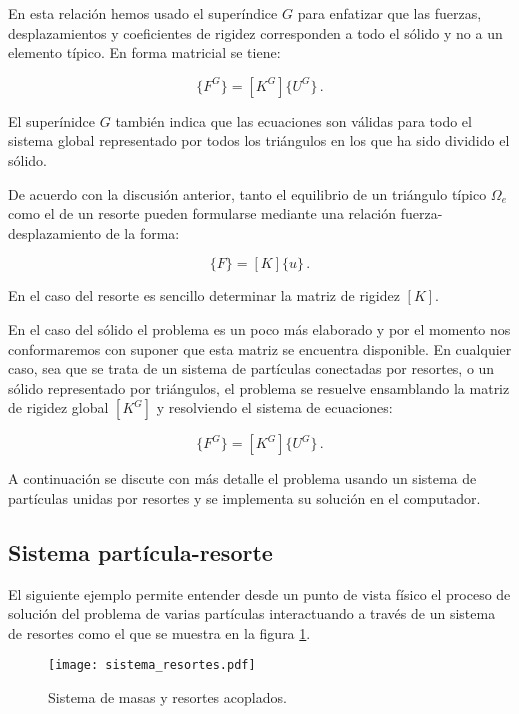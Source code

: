 En esta relación hemos usado el superíndice $G$ para enfatizar que las fuerzas, 
desplazamientos y coeficientes de rigidez corresponden a todo el sólido y no a 
un elemento típico. En forma matricial se tiene:

\begin{equation}
\{ F^G \} = [ K^G ] \{ U^G \}\, .
\end{equation}

El superínidce $G$ también indica que las ecuaciones son válidas para todo el 
sistema global representado por todos los triángulos en los que ha sido 
dividido el sólido.

De acuerdo con la discusión anterior, tanto el equilibrio de un triángulo 
típico $\Omega_e$ como el de un resorte pueden formularse mediante una relación 
fuerza-desplazamiento de la forma:

\begin{equation}
\{ F \} = [ K ] \{ u \}\, .
\end{equation}

En el caso del resorte es sencillo determinar la matriz de rigidez $[K]$.

En el caso del sólido el problema es un poco más elaborado y por el momento nos 
conformaremos con suponer que esta matriz se encuentra disponible. En cualquier 
caso, sea que se trata de un sistema de partículas conectadas por resortes, o 
un sólido representado por triángulos, el problema se resuelve ensamblando la 
matriz de rigidez global $[K^G]$ y resolviendo el sistema de ecuaciones:

\begin{equation}
\{ F^G \} = [ K^G ] \{ U^G \}\, .
\end{equation}

A continuación se discute con más detalle el problema usando un sistema de 
partículas unidas por resortes y se implementa su solución en el computador.

\subsection{Sistema partícula-resorte}
El siguiente ejemplo permite entender desde un punto de vista físico el proceso 
de solución del problema de varias partículas interactuando a través de un 
sistema de resortes como el que se muestra en la figura 
\ref{fig:sistema_resortes}.
\begin{figure}[H]
\centering
\texttt{[image: sistema\_resortes.pdf]}
\caption{Sistema de masas y resortes acoplados.}
\label{fig:sistema_resortes}
\end{figure}

